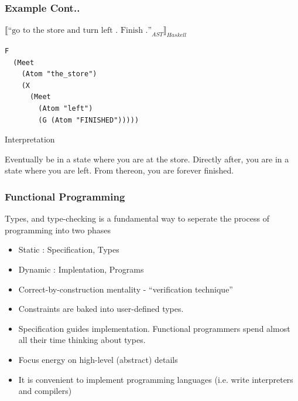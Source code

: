 \documentclass{beamer}
\begin{document}
\begin{frame}[fragile]
\frametitle{Example Cont..}
${\llbracket  \text{``go to the store and turn left . Finish .''}_{AST} \rrbracket_{Haskell}}$
\begin{verbatim}
F
  (Meet
    (Atom "the_store") 
    (X 
      (Meet 
        (Atom "left") 
        (G (Atom "FINISHED")))))
\end{verbatim}

\begin{exampleblock}{Interpretation}
  
Eventually be in a state where you are at the store. Directly after, you are in
a state where you are left. From thereon, you are forever finished.

\end{exampleblock}
\end{frame}


\begin{frame}
\frametitle{Functional Programming}
\begin{block}{}
Types, and type-checking is a fundamental way to seperate the process of
programming into two phases
\begin{itemize}
\item Static  : Specification, Types 
\item Dynamic : Implentation, Programs 
\end{itemize}
\end{block}

\begin{itemize}
\item Correct-by-construction mentality - ``verification technique''
\item Constraints are baked into user-defined types.
\item Specification guides implementation. Functional
  programmers spend almost all their time thinking about types.
\item Focus energy on high-level (abstract) details
\item It is convenient to implement programming languages
(i.e. write interpreters and compilers)
\end{itemize}
\end{frame}
\end{document}

